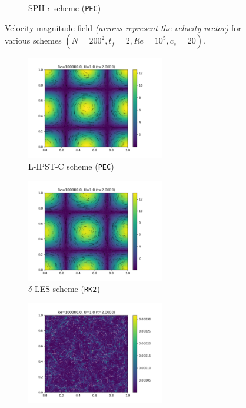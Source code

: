 \begin{figure}[htbp!]
\begin{subfigure}{7cm}
  \caption{SPH-$\epsilon$ scheme (\texttt{PEC})}
  \end{subfigure}
  \caption{Velocity magnitude field \textit{(arrows represent the velocity vector)} for various schemes $(N=200^2, t_f=2, Re=10^5, c_s=20)$.}
  \label{fig:ltgv-scheme-vmag}
\end{figure}

\begin{figure}[htbp!]
  \begin{subfigure}{7cm}
  \centering\includegraphics[width=6cm]{Code-Figures/long-tgv/c0_20_tait_hdx_2_pec_dtmul_1_sd_n_o_files_50_nx_200_pst_10_re_100000_tsph_wcsph_tf_2/final_omega_mag.png}
  \caption{L-IPST-C scheme (\texttt{PEC})}
  \end{subfigure}
  \begin{subfigure}{7cm}
  \centering\includegraphics[width=6cm]{Code-Figures/long-tgv/c0_20_tait_hdx_2_rk2_dtmul_1.5_n_o_files_50_nx_200_pst_10_re_100000_deltales_tf_2/final_omega_mag.png}
  \caption{$\delta$-LES scheme (\texttt{RK2})}
  \end{subfigure}
  \begin{subfigure}{7cm}
  \centering\includegraphics[width=6cm]{Code-Figures/long-tgv/c0_20_tait_hdx_2_pec_dtmul_1_no_n_o_files_50_nx_200_pst_10_re_100000_k_eps_tf_2/final_omega_mag.png}

\end{subfigure}
\end{figure}
